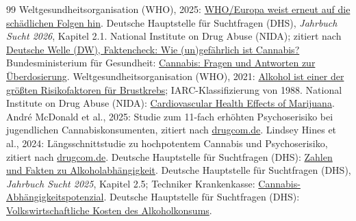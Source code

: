 \documentclass[11pt,a4paper]{article}
\begin{document}
	\newpage
	\begin{thebibliography}{99}
		 Weltgesundheitsorganisation (WHO), 2025: \href{https://www.who.int/europe/de/news/item/24-12-2025-1-in-3-injury-deaths-caused-by-alcohol--who-europe-reiterates-the-harms}{WHO/Europa weist erneut auf die schädlichen Folgen hin}.
		 Deutsche Hauptstelle für Suchtfragen (DHS), \textit{Jahrbuch Sucht 2026}, Kapitel 2.1.
		 National Institute on Drug Abuse (NIDA); zitiert nach \href{https://www.dw.com/de/faktencheck-wie-ungef%C3%A4hrlich-ist-cannabis/a-65853237}{Deutsche Welle (DW), Faktencheck: Wie (un)gefährlich ist Cannabis?}
		 Bundesministerium für Gesundheit: \href{https://www.bundesgesundheitsministerium.de/themen/cannabis/faq-cannabis/ueberdosierung.html}{Cannabis: Fragen und Antworten zur Überdosierung}.
		 Weltgesundheitsorganisation (WHO), 2021: \href{https://www.who.int/europe/de/home/20-10-2021-alcohol-is-one-of-the-biggest-risk-factors-for-breast-cancer}{Alkohol ist einer der größten Risikofaktoren für Brustkrebs}; IARC-Klassifizierung von 1988.
		 National Institute on Drug Abuse (NIDA): \href{https://nida.nih.gov/publications/research-reports/marijuana/cardiovascular-health-effects}{Cardiovascular Health Effects of Marijuana}.
		 André McDonald et al., 2025: Studie zum 11-fach erhöhten Psychoserisiko bei jugendlichen Cannabiskonsumenten, zitiert nach \href{https://www.drugcom.de/news/jugendliche-die-cannabis-konsumieren-haben-ein-erhoehtes-risiko-fuer-psychose/}{drugcom.de}.
		 Lindsey Hines et al., 2024: Längsschnittstudie zu hochpotentem Cannabis und Psychoserisiko, zitiert nach \href{https://www.drugcom.de/news/hochpotenter-cannabis-verdoppelt-risiko-fuer-psychotische-symptome/}{drugcom.de}.
		 Deutsche Hauptstelle für Suchtfragen (DHS): \href{https://www.dhs.de/sucht/zahlen-und-fakten.html}{Zahlen und Fakten zu Alkoholabhängigkeit}.
		 Deutsche Hauptstelle für Suchtfragen (DHS), \textit{Jahrbuch Sucht 2025}, Kapitel 2.5; Techniker Krankenkasse: \href{https://www.tk.de/techniker/gesundheit-und-medizin/erste-hilfe-und-gesundheitsvorsorge/sucht-und-abhaengigkeit/cannabis/cannabis-abhaengigkeitspotenzial-2075314}{Cannabis-Abhängigkeitspotenzial}.
		 Deutsche Hauptstelle für Suchtfragen (DHS): \href{https://www.dhs.de/sucht/zahlen-und-fakten.html}{Volkswirtschaftliche Kosten des Alkoholkonsums}.

\end{thebibliography}
\end{document}
